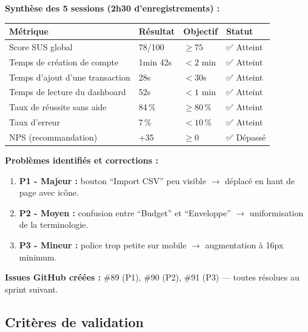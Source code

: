 \begin{tcolorbox}[colback=green!5!white,colframe=green!60!black,title=\textbf{Résultats des tests utilisateurs — Novembre 2024}]
\textbf{Synthèse des 5 sessions (2h30 d'enregistrements) :}

\begin{center}
\begin{tabular}{|p{4cm}|p{2.5cm}|p{2.5cm}|p{3cm}|}
\hline
\textbf{Métrique} & \textbf{Résultat} & \textbf{Objectif} & \textbf{Statut} \\
\hline
Score SUS global & 78/100 & $\geq 75$ & ✅ Atteint \\
\hline
Temps de création de compte & 1min 42s & $< 2$ min & ✅ Atteint \\
\hline
Temps d'ajout d'une transaction & 28s & $< 30$s & ✅ Atteint \\
\hline
Temps de lecture du dashboard & 52s & $< 1$ min & ✅ Atteint \\
\hline
Taux de réussite sans aide & 84\,\% & $\geq 80\,\%$ & ✅ Atteint \\
\hline
Taux d'erreur & 7\,\% & $< 10\,\%$ & ✅ Atteint \\
\hline
NPS (recommandation) & +35 & $\geq 0$ & ✅ Dépassé \\
\hline
\end{tabular}
\end{center}

\textbf{Problèmes identifiés et corrections :}
\begin{enumerate}
    \item \textbf{P1 - Majeur :} bouton ``Import CSV'' peu visible $\rightarrow$ déplacé en haut de page avec icône.
    \item \textbf{P2 - Moyen :} confusion entre ``Budget'' et ``Enveloppe'' $\rightarrow$ uniformisation de la terminologie.
    \item \textbf{P3 - Mineur :} police trop petite sur mobile $\rightarrow$ augmentation à 16px minimum.
\end{enumerate}

\textbf{Issues GitHub créées :} \#89 (P1), \#90 (P2), \#91 (P3) — toutes résolues au sprint suivant.
\end{tcolorbox}

\subsection{Critères de validation}


